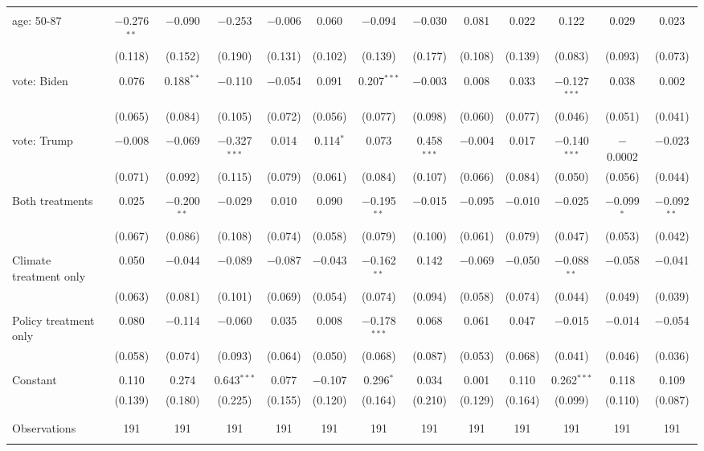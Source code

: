 \begin{tabular}{@{\extracolsep{5pt}}lcccccccccccc}
  & & & & & & & & & & & & \\ 
 age: 50-87 & $-$0.276$^{**}$ & $-$0.090 & $-$0.253 & $-$0.006 & 0.060 & $-$0.094 & $-$0.030 & 0.081 & 0.022 & 0.122 & 0.029 & 0.023 \\ 
  & (0.118) & (0.152) & (0.190) & (0.131) & (0.102) & (0.139) & (0.177) & (0.108) & (0.139) & (0.083) & (0.093) & (0.073) \\ 
  & & & & & & & & & & & & \\ 
 vote: Biden & 0.076 & 0.188$^{**}$ & $-$0.110 & $-$0.054 & 0.091 & 0.207$^{***}$ & $-$0.003 & 0.008 & 0.033 & $-$0.127$^{***}$ & 0.038 & 0.002 \\ 
  & (0.065) & (0.084) & (0.105) & (0.072) & (0.056) & (0.077) & (0.098) & (0.060) & (0.077) & (0.046) & (0.051) & (0.041) \\ 
  & & & & & & & & & & & & \\ 
 vote: Trump & $-$0.008 & $-$0.069 & $-$0.327$^{***}$ & 0.014 & 0.114$^{*}$ & 0.073 & 0.458$^{***}$ & $-$0.004 & 0.017 & $-$0.140$^{***}$ & $-$0.0002 & $-$0.023 \\ 
  & (0.071) & (0.092) & (0.115) & (0.079) & (0.061) & (0.084) & (0.107) & (0.066) & (0.084) & (0.050) & (0.056) & (0.044) \\ 
  & & & & & & & & & & & & \\ 
 Both treatments & 0.025 & $-$0.200$^{**}$ & $-$0.029 & 0.010 & 0.090 & $-$0.195$^{**}$ & $-$0.015 & $-$0.095 & $-$0.010 & $-$0.025 & $-$0.099$^{*}$ & $-$0.092$^{**}$ \\ 
  & (0.067) & (0.086) & (0.108) & (0.074) & (0.058) & (0.079) & (0.100) & (0.061) & (0.079) & (0.047) & (0.053) & (0.042) \\ 
  & & & & & & & & & & & & \\ 
 Climate treatment only & 0.050 & $-$0.044 & $-$0.089 & $-$0.087 & $-$0.043 & $-$0.162$^{**}$ & 0.142 & $-$0.069 & $-$0.050 & $-$0.088$^{**}$ & $-$0.058 & $-$0.041 \\ 
  & (0.063) & (0.081) & (0.101) & (0.069) & (0.054) & (0.074) & (0.094) & (0.058) & (0.074) & (0.044) & (0.049) & (0.039) \\ 
  & & & & & & & & & & & & \\ 
 Policy treatment only & 0.080 & $-$0.114 & $-$0.060 & 0.035 & 0.008 & $-$0.178$^{***}$ & 0.068 & 0.061 & 0.047 & $-$0.015 & $-$0.014 & $-$0.054 \\ 
  & (0.058) & (0.074) & (0.093) & (0.064) & (0.050) & (0.068) & (0.087) & (0.053) & (0.068) & (0.041) & (0.046) & (0.036) \\ 
  & & & & & & & & & & & & \\ 
 Constant & 0.110 & 0.274 & 0.643$^{***}$ & 0.077 & $-$0.107 & 0.296$^{*}$ & 0.034 & 0.001 & 0.110 & 0.262$^{***}$ & 0.118 & 0.109 \\ 
  & (0.139) & (0.180) & (0.225) & (0.155) & (0.120) & (0.164) & (0.210) & (0.129) & (0.164) & (0.099) & (0.110) & (0.087) \\ 
  & & & & & & & & & & & & \\ 
\hline \\[-1.8ex] 

Observations & 191 & 191 & 191 & 191 & 191 & 191 & 191 & 191 & 191 & 191 & 191 & 191 \\ 
\hline 
\hline \\[-1.8ex] 
\end{tabular} 